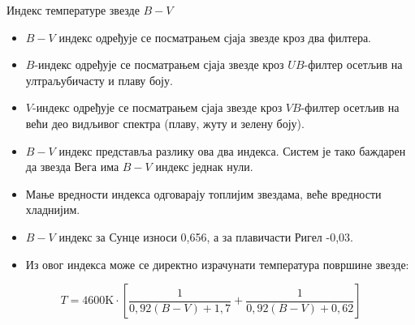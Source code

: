 \documentclass[aspectratio=169, xcolor=table, 10pt]{beamer}
\begin{document}
\begin{frame}{Индекс температуре звезде $B-V$}
  \begin{itemize}
    \item $B-V$ индекс одређује се посматрањем сјаја звезде кроз два филтера.
    \item $B$-индекс одређује се посматрањем сјаја звезде кроз $UB$-филтер осетљив на ултраљубичасту и плаву боју.
    \item $V$-индекс одређује се посматрањем сјаја звезде кроз $VB$-филтер осетљив на већи део видљивог спектра (плаву, жуту и зелену боју).
    \item $B-V$ индекс представља разлику ова два индекса. Систем је тако баждарен да звезда Вега има $B-V$ индекс једнак нули.
    \item Мање вредности индекса одговарају топлијим звездама, веће вредности хладнијим.
    \item $B-V$ индекс за Сунце износи 0,656, а за плавичасти Ригел -0,03.
    \item Из овог индекса може се директно израчунати температура површине звезде:
  \end{itemize}
  \begin{equation*}
    T=4600\text{K}\cdot\left[\frac{1}{0,92(B-V)+1,7}+\frac{1}{0,92(B-V)+0,62}\right]
  \end{equation*}
\end{frame}
\end{document}
